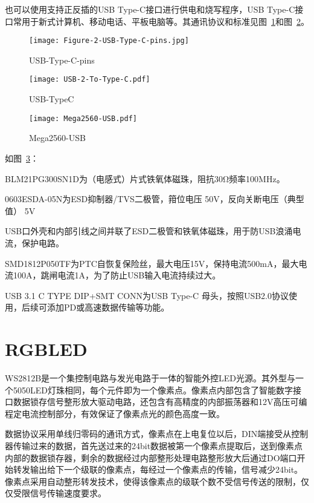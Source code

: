 也可以使用支持正反插的USB Type-C接口进行供电和烧写程序，USB Type-C接口常用于新式计算机、移动电话、平板电脑等。其通讯协议和标准见图~\ref{fig:USB-Type-C-pins}和图~\ref{fig:USB-TypeC}。

\begin{figure}[htbp]
    \centering
    \texttt{[image: Figure-2-USB-Type-C-pins.jpg]}
    \caption{USB-Type-C-pins}
    \label{fig:USB-Type-C-pins}
\end{figure}

\begin{figure}[htbp]
    \centering
    \texttt{[image: USB-2-To-Type-C.pdf]}
    \caption{USB-TypeC}
    \label{fig:USB-TypeC}
\end{figure}



\begin{figure}[htbp]
    \centering
    \texttt{[image: Mega2560-USB.pdf]}
    \caption{Mega2560-USB}
    \label{fig:Mega2560-USB}
\end{figure}

如图~\ref{fig:Mega2560-USB}：

BLM21PG300SN1D为（电感式）片式铁氧体磁珠，阻抗30Ω频率100MHz。

0603ESDA-05N为ESD抑制器/TVS二极管，箝位电压	50V，反向关断电压（典型值）	5V

USB口外壳和内部引线之间并联了ESD二极管和铁氧体磁珠，用于防USB浪涌电流，保护电路。

SMD1812P050TF为PTC自恢复保险丝，最大电压15V，保持电流500mA，最大电流100A，跳闸电流1A，为了防止USB输入电流持续过大。

USB 3.1 C TYPE DIP+SMT CONN为USB Type-C 母头，按照USB2.0协议使用，后续可添加PD或高速数据传输等功能。

\section{RGBLED}

WS2812B是一个集控制电路与发光电路于一体的智能外控LED光源。其外型与一个5050LED灯珠相同，每个元件即为一个像素点。像素点内部包含了智能数字接口数据锁存信号整形放大驱动电路，还包含有高精度的内部振荡器和12V高压可编程定电流控制部分，有效保证了像素点光的颜色高度一致。

数据协议采用单线归零码的通讯方式，像素点在上电复位以后，DIN端接受从控制器传输过来的数据，首先送过来的24bit数据被第一个像素点提取后，送到像素点内部的数据锁存器，剩余的数据经过内部整形处理电路整形放大后通过DO端口开始转发输出给下一个级联的像素点，每经过一个像素点的传输，信号减少24bit。像素点采用自动整形转发技术，使得该像素点的级联个数不受信号传送的限制，仅仅受限信号传输速度要求。

